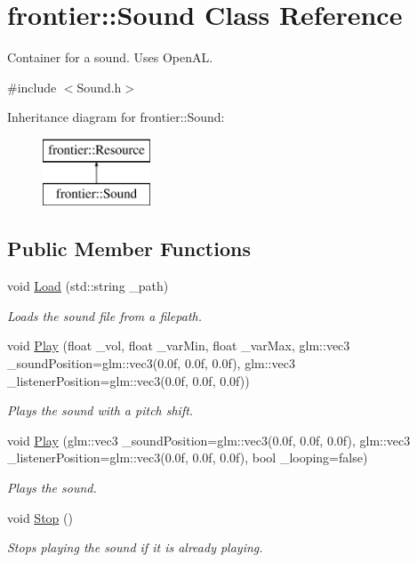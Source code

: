\hypertarget{classfrontier_1_1_sound}{}\section{frontier\+:\+:Sound Class Reference}
\label{classfrontier_1_1_sound}


Container for a sound. Uses Open\+AL.  




{\ttfamily \#include $<$Sound.\+h$>$}

Inheritance diagram for frontier\+:\+:Sound\+:\begin{figure}[H]
\begin{center}
\leavevmode
\includegraphics[height=2.000000cm]{classfrontier_1_1_sound}
\end{center}
\end{figure}
\subsection*{Public Member Functions}
\begin{DoxyCompactItemize}
\item 
void \hyperlink{classfrontier_1_1_sound_a9a34b2a30c3eb91702b07c35de9d140b}{Load} (std\+::string \+\_\+path)
\begin{DoxyCompactList}\small\item\em Loads the sound file from a filepath. \end{DoxyCompactList}\item 
void \hyperlink{classfrontier_1_1_sound_a10dbe1366c8069e71e4d3d9f3d8def59}{Play} (float \+\_\+vol, float \+\_\+var\+Min, float \+\_\+var\+Max, glm\+::vec3 \+\_\+sound\+Position=glm\+::vec3(0.\+0f, 0.\+0f, 0.\+0f), glm\+::vec3 \+\_\+listener\+Position=glm\+::vec3(0.\+0f, 0.\+0f, 0.\+0f))
\begin{DoxyCompactList}\small\item\em Plays the sound with a pitch shift. \end{DoxyCompactList}\item 
void \hyperlink{classfrontier_1_1_sound_ae3a9579cf18de757f4bfb02ebf7c688f}{Play} (glm\+::vec3 \+\_\+sound\+Position=glm\+::vec3(0.\+0f, 0.\+0f, 0.\+0f), glm\+::vec3 \+\_\+listener\+Position=glm\+::vec3(0.\+0f, 0.\+0f, 0.\+0f), bool \+\_\+looping=false)
\begin{DoxyCompactList}\small\item\em Plays the sound. \end{DoxyCompactList}\item 
void \hyperlink{classfrontier_1_1_sound_abece17f8675b311e509c969254411c73}{Stop} ()
\begin{DoxyCompactList}\small\item\em Stops playing the sound if it is already playing. \end{DoxyCompactList}\end{DoxyCompactItemize}
